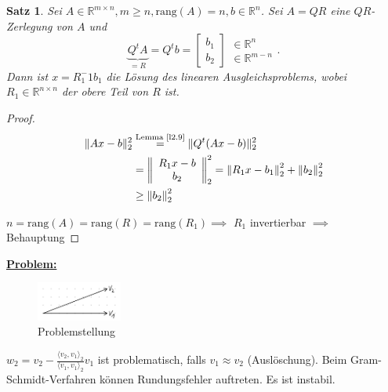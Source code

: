 \documentclass{book}
\newtheorem{theorem}[algorithm]{Satz}
\def\R{\mathbb{R}}
\def\rang{\text{rang}}
\begin{document}
        \begin{theorem}\label{s2.11}
            Sei $A\in\R^{m\times n},m\geq n,\rang(A)=n,b\in\R^n$. Sei $A=QR$ eine $QR$-Zerlegung von $A$ und 
            \[\underbrace{Q^tA}_{=R}=Q^tb=\begin{bmatrix}
                b_1\\
                b_2
            \end{bmatrix}\begin{array}{c}
                \in \R^n \\
                \in\R^{m-n}
            \end{array}.\]
            Dann ist $x=R_1^-1b_1$ die Lösung des linearen Ausgleichsproblems, wobei $R_1\in\R^{n\times n}$ der obere Teil von $R$ ist.
        \end{theorem}

        \begin{proof}
            \begin{align*}
                \Vert Ax-b \Vert_2^2&\stackrel{\text{Lemma \ref{l2.9}}}{=}\Vert Q^t(Ax-b) \Vert_2^2\\
                & =\left\Vert \begin{array}{c}
                    R_1 x-b\\ b_2
                \end{array} \right\Vert_2^2 = \left\Vert R_1x-b_1 \right\Vert_2^2+ \left\Vert b_2 \right\Vert_2^2\\
                & \geq \left\Vert b_2 \right\Vert_2^2
            \end{align*}

            $n=\rang(A)=\rang(R)=\rang(R_1)\implies$ $R_1$ invertierbar $\implies$ Behauptung

        \end{proof}

        \underline{\textbf{Problem:}}

        \begin{figure}[H]
            \centering
            \includegraphics[width=0.25\textwidth]{Bild004}
            \caption{Problemstellung}
        \end{figure}

        $w_2=v_2-\frac{\langle v_2,v_1 \rangle_2}{\langle v_1,v_1 \rangle_2}v_1$ ist problematisch, falls $v_1\approx v_2$ (Auslöschung).
        Beim Gram-Schmidt-Verfahren können Rundungsfehler auftreten. Es ist instabil.
\end{document}
